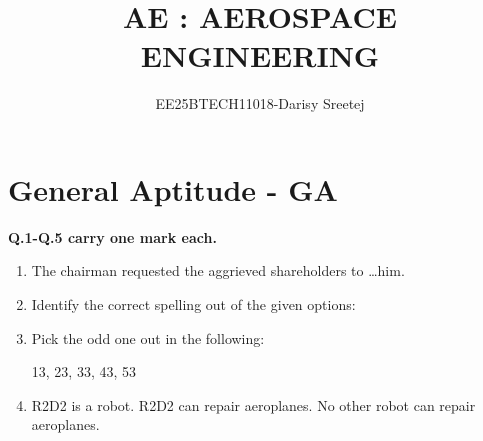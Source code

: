 \documentclass[journal,12pt,onecolumn]{IEEEtran}
\title{ AE : AEROSPACE ENGINEERING}
\author{EE25BTECH11018-Darisy Sreetej}
\theoremstyle{remark}
\begin{document}
\maketitle

\section{General Aptitude - GA }
\textbf{Q.1-Q.5 carry one mark each.}
\begin{enumerate}
\item The chairman requested the aggrieved shareholders to \dots him.
    \begin{enumerate}
    \end{enumerate}

\item Identify the correct spelling out of the given options:
    \begin{enumerate}
    \end{enumerate}

\item Pick the odd one out in the following:

13, 23, 33, 43, 53

    \begin{enumerate}
    \end{enumerate}

\item R2D2 is a robot. R2D2 can repair aeroplanes. No other robot can repair aeroplanes.


\end{enumerate}
\end{document}
